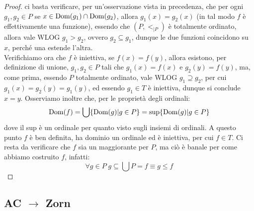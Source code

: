 \begin{proof}
	ci basta verificare, per un'osservazione vista in precedenza, che per ogni $g_1,g_2 \in P$ se $x \in \operatorname{Dom}(g_1) \cap \operatorname{Dom}(g_2)$, allora $g_1(x) = g_2(x)$ (in tal modo $f$ è effettivamente una funzione), essendo che $(P,<_{|P})$ è totalmente ordinato, allora vale WLOG $g_1 > g_2$,
	ovvero $g_2 \subseteq g_1$, dunque le due funzioni coincidono su $x$, perché una estende l'altra.\\
	Verifichiamo ora che $f$ è iniettiva, se $f(x) = f(y)$, allora esistono, per definizione di unione, $g_1,g_2 \in P$ tali che $g_1(x) = f(x)$ e $g_2(y) = f(y)$, ma, come prima, essendo $P$ totalmente ordinato, vale WLOG $g_1 \supseteq g_2$, per cui $g_1(x) = g_2(y) = g_1(y)$, ed essendo $g_1 \in T$ è iniettiva, dunque si conclude $x = y$.
	Osserviamo inoltre che, per le proprietà degli ordinali:
	\[ \operatorname{Dom}(f) = \bigcup\{\operatorname{Dom}(g) | g \in P\} = \sup\{\operatorname{Dom}(g) | g \in P\}
		\]
	dove il sup è un ordinale per quanto visto sugli insiemi di ordinali. A questo punto $f$ è ben definita, ha dominio un ordinale ed è iniettiva, per cui $f \in T$. Ci resta da verificare che $f$ sia un maggiorante per $P$, ma ciò è banale per come abbiamo costruito $f$, infatti:
	\[ \forall g \in P \; g \subseteq \bigcup P = f \equiv g \leq f
		\]
\end{proof}
 
\subsection{\texorpdfstring{AC $\rightarrow$ Zorn}{AC implica Zorn}}

